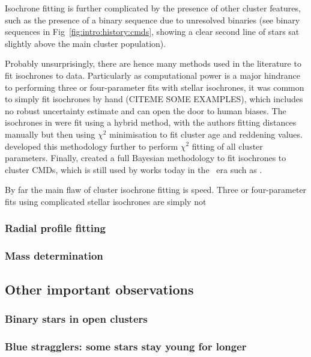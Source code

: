 Isochrone fitting is further complicated by the presence of other cluster features, such as the presence of a binary sequence due to unresolved binaries (see binary sequences in Fig~\ref{fig:intro:history:cmds}, showing a clear second line of stars sat slightly above the main cluster population).

Probably unsurprisingly, there are hence many methods used in the literature to fit isochrones to data. Particularly as computational power is a major hindrance to performing three or four-parameter fits with stellar isochrones, it was common to simply fit isochrones by hand (CITEME SOME EXAMPLES), which includes no robust uncertainty estimate and can open the door to human biases. The isochrones in \cite{kharchenko_global_2013} were fit using a hybrid method, with the authors fitting distances manually but then using $\chi^2$ minimisation to fit cluster age and reddening values. \cite{yen_reanalysis_2018} developed this methodology further to perform $\chi^2$ fitting of all cluster parameters. Finally, \cite{hippel_inverting_2006} created a full Bayesian methodology to fit isochrones to cluster CMDs, which is still used by works today in the \gaia\ era such as \cite{bossini_age_2019}.

By far the main flaw of cluster isochrone fitting is speed. Three or four-parameter fits using complicated stellar isochrones are simply not 

\subsubsection{Radial profile fitting}

\subsubsection{Mass determination}


\subsection{Other important observations}
\label{sec:intro:history:other_obs}

\subsubsection{Binary stars in open clusters}

\subsubsection{Blue stragglers: some stars stay young for longer}

